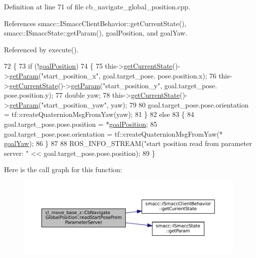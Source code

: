Definition at line 71 of file cb\+\_\+navigate\+\_\+global\+\_\+position.\+cpp.



References smacc\+::\+I\+Smacc\+Client\+Behavior\+::get\+Current\+State(), smacc\+::\+I\+Smacc\+State\+::get\+Param(), goal\+Position, and goal\+Yaw.



Referenced by execute().


\begin{DoxyCode}
72     \{
73         \textcolor{keywordflow}{if} (!\hyperlink{classcl__move__base__z_1_1CbNavigateGlobalPosition_a51a0266fd9a63e99f26e88933529c559}{goalPosition})
74         \{
75             this->\hyperlink{classsmacc_1_1ISmaccClientBehavior_a34fde34e48fa13db622ee60d8374d0b8}{getCurrentState}()->\hyperlink{classsmacc_1_1ISmaccState_abbb3a24b912c6e8de28f7b86123b6357}{getParam}(\textcolor{stringliteral}{"start\_position\_x"}, goal.target\_pose.
      pose.position.x);
76             this->\hyperlink{classsmacc_1_1ISmaccClientBehavior_a34fde34e48fa13db622ee60d8374d0b8}{getCurrentState}()->\hyperlink{classsmacc_1_1ISmaccState_abbb3a24b912c6e8de28f7b86123b6357}{getParam}(\textcolor{stringliteral}{"start\_position\_y"}, goal.target\_pose.
      pose.position.y);
77             \textcolor{keywordtype}{double} yaw;
78             this->\hyperlink{classsmacc_1_1ISmaccClientBehavior_a34fde34e48fa13db622ee60d8374d0b8}{getCurrentState}()->\hyperlink{classsmacc_1_1ISmaccState_abbb3a24b912c6e8de28f7b86123b6357}{getParam}(\textcolor{stringliteral}{"start\_position\_yaw"}, yaw);
79 
80             goal.target\_pose.pose.orientation = tf::createQuaternionMsgFromYaw(yaw);
81         \}
82         \textcolor{keywordflow}{else}
83         \{
84             goal.target\_pose.pose.position = *\hyperlink{classcl__move__base__z_1_1CbNavigateGlobalPosition_a51a0266fd9a63e99f26e88933529c559}{goalPosition};
85             goal.target\_pose.pose.orientation = tf::createQuaternionMsgFromYaw(*
      \hyperlink{classcl__move__base__z_1_1CbNavigateGlobalPosition_a839900de7f664b27c9be189fadbaa003}{goalYaw});
86         \}
87 
88         ROS\_INFO\_STREAM(\textcolor{stringliteral}{"start position read from parameter server: "} << goal.target\_pose.pose.position);
89     \}
\end{DoxyCode}
Here is the call graph for this function\+:
\nopagebreak
\begin{figure}[H]
\begin{center}
\leavevmode
\includegraphics[width=350pt]{classcl__move__base__z_1_1CbNavigateGlobalPosition_a868b25f238e3781c9a2e44b4e1502fcc_cgraph}
\end{center}
\end{figure}
